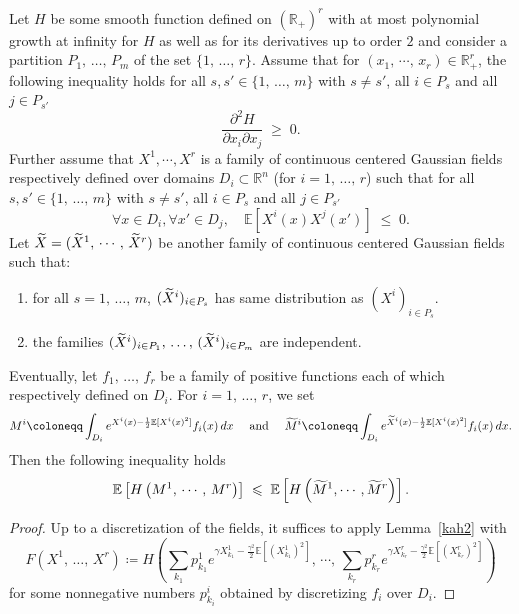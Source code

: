 \documentclass[AHL,Unicode,longabstracts,published]{cedram}
\renewcommand{\tilde}{\widetilde}
\renewcommand{\leq}{\;\leqslant\;}
\renewcommand{\geq}{\;\geqslant\;}
\newcommand{\R}{\mathbb{R}}
\newcommand{\E}{\mathbb{E}}
\newcommand*\green[1]{#1}
\let\oldtilde\tilde
\renewcommand*{\tilde}[1]{\mathchoice{\widetilde{#1}}{\widetilde{#1}}{\oldtilde{#1}}{\oldtilde{#1}}}
\let\oldforall\forall
\renewcommand*{\forall}{\mathrel{\oldforall}}
\begin{document}
\begin{coro}\label{comparison}
Let $H$ be some smooth function defined on $(\R_+)^{r}$ with at most polynomial growth at infinity for $H$ as well as for its derivatives up to order $2$ and consider a partition $P_1,\,\dots,\,P_m$ of the set $\{1,\,\dots,\,r\}$. Assume that for $(x_1,\,\cdots,\,x_{r}) \in \R_+^{r}$, the following inequality holds for all $s,s'\in \{1,\,\dots,\,m\}$ with $s\not=s'$, all $i\in P_{s}$ and all $j\in P_{s'}$
\begin{equation*}
\frac{\partial^2 H}{\partial x_i \partial x_j } \geq 0.
\end{equation*}
Further assume that $X^1, \cdots, X^{\green r}$ is a family of continuous centered Gaussian fields respectively defined over domains $D_i\subset \R^n$ (for $i=1,\,\dots,\,{r}$) such that for all $ s,s'\in \{1,\,\dots,\,m\}$ with $s\not=s'$, all $i\in P_{s}$ and all $j\in P_{s'}$
\begin{equation*}
\forall x\in D_i,\forall x'\in D_j,\quad \E[X^i(x) X^j(x')] \leq 0.
\end{equation*}
Let $\tilde{X}=(\tilde{X}^1,\,\cdots,\,\tilde{X}^{r})$ be another family of continuous centered Gaussian fields such that:
\begin{enumerate}
\item for all $ s=1,\,\dots,\,m$, $ (\tilde{X}^i)_{i\in P_{s}} $ has same distribution as $(X^i)_{i\in P_{s}} $.
\item the families $(\tilde{X}^i)_{i\in P_1},\,\dots,\,(\tilde{X}^i)_{i\in P_m}$ are independent.
\end{enumerate}

Eventually, let $f_1,\,\dots,\,f_{r}$ be a family of positive functions each of which respectively defined on $D_i$. For $i=1,\,\dots,\,r$, we set
\[
M^i\coloneqq \int_{D_i} e^{X^i(x)-\frac{1}{2}\E[X^i(x)^2]}f_i(x)\,dx\quad \text{ and }\quad \tilde M^i\coloneqq \int_{D_i} e^{\tilde X^i(x)-\frac{1}{2}\E[X^i(x)^2] }f_i(x)\,dx.
\]
Then the following inequality holds
\begin{equation*}
\E\left[H\left(M^1,\, \cdots,\, M^{r}\right)\right] \leq \E\left[H\left(\tilde{M}^1, \cdots, \tilde{M}^{r}\right)\right].
\end{equation*}
\end{coro}

\begin{proof}
 Up to a discretization of the fields, it suffices to apply Lemma~\ref{kah2} with
\[
F\left(X^1,\,\dots,\,X^{r}\right)\coloneqq H\left(\sum_{k_1}p^1_{k_1}e^{\gamma X^1_{k_1}-\frac{\gamma^2}{2}\E\left[\left(X^1_{k_1}\right)^2\right]},\,\cdots,\,\sum_{k_{ r}}p^{r}_{k_{r}}e^{\gamma X^{r}_{k_{r}}-\frac{\gamma^2}{2}\E\left[\left(X^{r}_{k_{r}}\right)^2\right]}\right)
\]
for some nonnegative numbers $p^i_{k_i}$ obtained by discretizing $f_i$ over $D_i$.
\end{proof}
\end{document}
